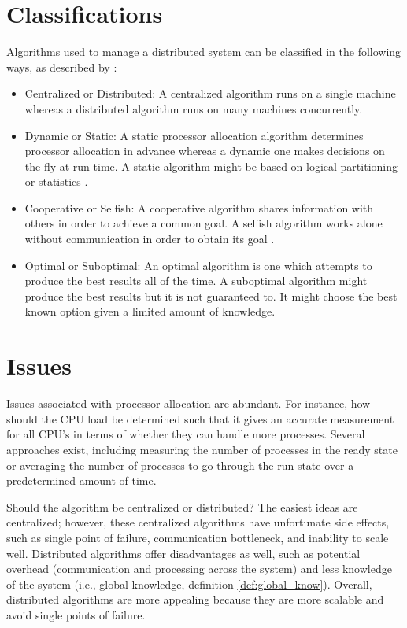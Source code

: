 \documentclass{report}
\begin{document}
\section{Classifications}

Algorithms used to manage a distributed system can be classified in the
following ways, as described by \cite{Casavant}:

\begin{itemize}
	\item Centralized or Distributed: A centralized algorithm runs on a
	single machine whereas a distributed algorithm runs on many machines
	concurrently.

	\item Dynamic or Static: A static processor allocation algorithm
	determines processor allocation in advance whereas a dynamic one
	makes decisions on the fly at run time.  A static algorithm might be
	based on logical partitioning or statistics \cite{random_probe}.

	\item Cooperative or Selfish:  A cooperative algorithm shares
	information with others in order to achieve a common goal.  A
	selfish algorithm works alone without communication in order to
	obtain its goal \cite{econ}.

	\item Optimal or Suboptimal: An optimal algorithm is one which
	attempts to produce the best results all of the time.  A suboptimal
	algorithm might produce the best results but it is not guaranteed
	to.  It might choose the best known option given a limited amount of
	knowledge.
\end{itemize}



\section{Issues}

Issues associated with processor allocation are abundant.  For instance, how
should the CPU load be determined such that it gives an accurate measurement
for all CPU's in terms of whether they can handle more processes.  Several
approaches exist, including measuring the number of processes in the ready
state or averaging the number of processes to go through the run state over
a predetermined amount of time.

Should the algorithm be centralized or distributed?  The easiest ideas are
centralized; however, these centralized algorithms have unfortunate side
effects, such as single point of failure, communication bottleneck, and
inability to scale well.  Distributed algorithms offer disadvantages as
well, such as potential overhead (communication and processing across the
system) and less knowledge of the system (i.e., global knowledge, definition
\ref{def:global_know}).  Overall, distributed algorithms are more appealing
because they are more scalable and avoid single points of failure.
\end{document}

